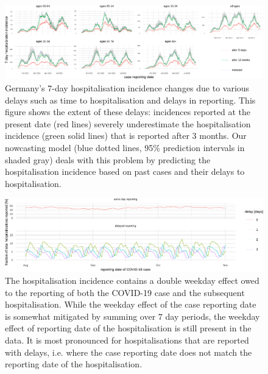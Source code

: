 \begin{figure}

{\centering \includegraphics[width=\textwidth]{figures_tentative/delays_in_reporting-1.pdf} 

}

\caption{Germany's $7$-day hospitalisation incidence changes due to various delays such as time to hospitalisation and delays in reporting. This figure shows the extent of these delays: incidences reported at the present date (red lines) severely underestimate the hospitalisation incidence (green solid lines) that is reported after $3$ months. Our nowcasting model (blue dotted lines, 95\% prediction intervals in shaded gray) deals with this problem by predicting the hospitalisation incidence based on past cases and their delays to hospitalisation.}\label{fig:delays_in_reporting}
\end{figure}

\begin{figure}

    {\centering \includegraphics[width=\textwidth]{figures_tentative/double_weekday_effect-1.pdf} 

}

\caption{The hospitalisation incidence contains a double weekday effect owed to the reporting of both the COVID-19 case and the subsequent hospitalisation. While the weekday effect of the case reporting date is somewhat mitigated by summing over $7$ day periods, the weekday effect of reporting date of the hospitalisation is still present in the data. It is most pronounced for hospitalisations that are reported with delays, i.e. where the case reporting date does not match the reporting date of the hospitalisation.}\label{fig:double_weekday_effect}
\end{figure}

